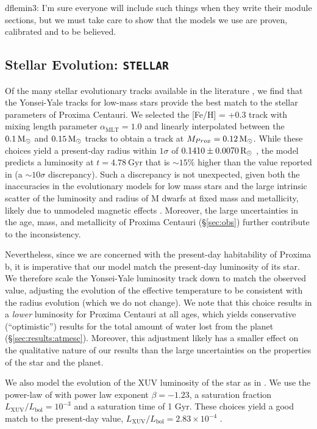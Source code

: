 \documentclass[preprint,12pt]{aastex}
\newcommand{\xxx}[1]{{\color{red} #1}} %
\def\msun{{\rm\,M_\odot}}
\def\rsun{{\rm\,R_\odot}}
\def\eg{{\it e.g.\ }}
\def\stellar{\texttt{\footnotesize{STELLAR}}\xspace}
\begin{document}
\xxx{dflemin3: I'm sure everyone will include such things when they
  write their module sections, but we must take care to show that the
  models we use are proven, calibrated and to be believed.}

\subsection{Stellar Evolution: \stellar}
\label{sec:models:stellar}

Of the many stellar evolutionary tracks available in the literature
\citep[\eg][]{Baraffe98,Dartmouth08,Baraffe15}, we find that the
Yonsei-Yale tracks for low-mass stars \citep{YonseiYale13} provide the
best match to the stellar parameters of Proxima Centauri. We selected
the [Fe/H] = +0.3 track with mixing length parameter
$\alpha_\mathrm{MLT} = 1.0$ and linearly interpolated between the $0.1
\msun$ and $0.15 \msun$ tracks to obtain a track at $M_{Prox} = 0.12
\msun$.  While these choices yield a present-day radius within
$1\sigma$ of $0.1410 \pm 0.0070 \rsun$ \citep{Boyajian12}, the model
predicts a luminosity at $t = 4.78\ \mathrm{Gyr}$ that is $\sim 15\%$
higher than the value reported in \cite{Boyajian12} (a $\sim 10\sigma$
discrepancy). Such a discrepancy is not unexpected, given both the
inaccuracies in the evolutionary models for low mass stars and the
large intrinsic scatter of the luminosity and radius of M dwarfs at
fixed mass and metallicity, likely due to unmodeled magnetic effects
\citep{YonseiYale13}. Moreover, the large uncertainties in the age,
mass, and metallicity of Proxima Centauri (\S\ref{sec:obs}) further
contribute to the inconsistency.

Nevertheless, since we are concerned with the present-day habitability
of Proxima b, it is imperative that our model match the present-day
luminosity of its star. We therefore scale the Yonsei-Yale luminosity
track down to match the observed value, adjusting the evolution of the
effective temperature to be consistent with the radius evolution
(which we do not change). We note that this choice results in a
\emph{lower} luminosity for Proxima Centauri at all ages, which yields
conservative (``optimistic'') results for the total amount of water
lost from the planet (\S\ref{sec:results:atmesc}). Moreover, this
adjustment likely has a smaller effect on the qualitative nature of
our results than the large uncertainties on the properties of the star
and the planet.

We also model the evolution of the XUV luminosity of the star as in
\cite{LugerBarnes15}. We use the power-law of \cite{Ribas05} with
power law exponent $\beta = -1.23$, a saturation fraction
$L_\mathrm{XUV}/L_\mathrm{bol} = 10^{-3}$ and a saturation time of 1
Gyr. These choices yield a good match to the present-day value,
$L_\mathrm{XUV}/L_\mathrm{bol} = 2.83\times 10^{-4}$
\citep{Boyajian12}.
\end{document}
